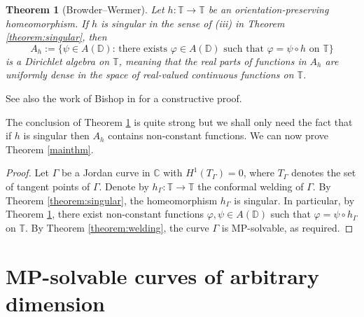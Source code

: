 \documentclass{amsart}
\theoremstyle{plain}
\newtheorem{theorem}{Theorem}[section]
\theoremstyle{definition}
\theoremstyle{remark}
\newcommand{\mC}{\mathbb{C}}
\newcommand{\mD}{\mathbb{D}}
\newcommand{\mT}{\mathbb{T}}
\begin{document}
\begin{theorem}[Browder--Wermer]
\label{theorem:browder}
Let $h:\mT \to \mT$ be an orientation-preserving homeomorphism. If $h$ is singular in the sense of (iii) in Theorem \ref{theorem:singular}, then
$$A_h:= \{\psi \in A(\mD): \, \mbox{there exists} \, \, \varphi \in A(\mD) \, \, \mbox{such that}\, \, \varphi=\psi \circ h \, \, \mbox{on} \, \, \mT\}$$
is a \textit{Dirichlet algebra} on $\mT$, meaning that the real parts of functions in $A_h$ are uniformly dense in the space of real-valued continuous functions on $\mT$.
\end{theorem}
See also the work of Bishop in \cite[Corollary 6.1]{Bishop1987} for a constructive proof.

The conclusion of Theorem \ref{theorem:browder} is quite strong but we shall only need the fact that if $h$ is singular then $A_h$ contains non-constant functions. We can now prove Theorem \ref{mainthm}.
\begin{proof}
Let $\Gamma$ be a Jordan curve in $\mC$ with $H^1(T_\Gamma)=0$, where $T_\Gamma$ denotes the set of tangent points of $\Gamma$. Denote by $h_\Gamma: \mT \to \mT$ the conformal welding of $\Gamma$. By Theorem \ref{theorem:singular}, the homeomorphism $h_\Gamma$ is singular. In particular, by Theorem \ref{theorem:browder}, there exist non-constant functions $\varphi, \psi \in A(\mD)$ such that $\varphi=\psi \circ h_\Gamma$ on $\mT$. By Theorem \ref{theorem:welding}, the curve $\Gamma$ is MP-solvable, as required.
\end{proof}


\section{MP-solvable curves of arbitrary dimension}
\label{sec4}
\end{document}
